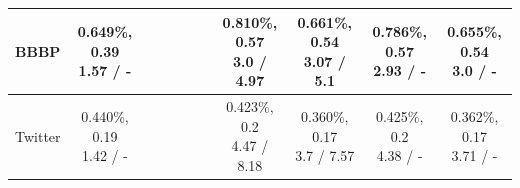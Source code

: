 \begin{table}[t]
{\begin{tabular}{p{3cm}|c|c|c|c|c|c|c|c|c|c}
\hline
BBBP & \shortstack{\scriptsize 0.649\%, 0.39\\\scriptsize 1.57 / -} &  &  &  &  &  & \shortstack{\scriptsize 0.810\%, 0.57\\\scriptsize 3.0 / 4.97} & \shortstack{\scriptsize 0.661\%, 0.54\\\scriptsize 3.07 / 5.1} & \shortstack{\scriptsize 0.786\%, 0.57\\\scriptsize 2.93 / -} & \shortstack{\scriptsize 0.655\%, 0.54\\\scriptsize 3.0 / -} \\
\hline
Twitter & \shortstack{\scriptsize 0.440\%, 0.19\\\scriptsize 1.42 / -} &  &  &  &  &  & \shortstack{\scriptsize 0.423\%, 0.2\\\scriptsize 4.47 / 8.18} & \shortstack{\scriptsize 0.360\%, 0.17\\\scriptsize 3.7 / 7.57} & \shortstack{\scriptsize 0.425\%, 0.2\\\scriptsize 4.38 / -} & \shortstack{\scriptsize 0.362\%, 0.17\\\scriptsize 3.71 / -} \\
\hline
\end{tabular}%
}
\end{table}
